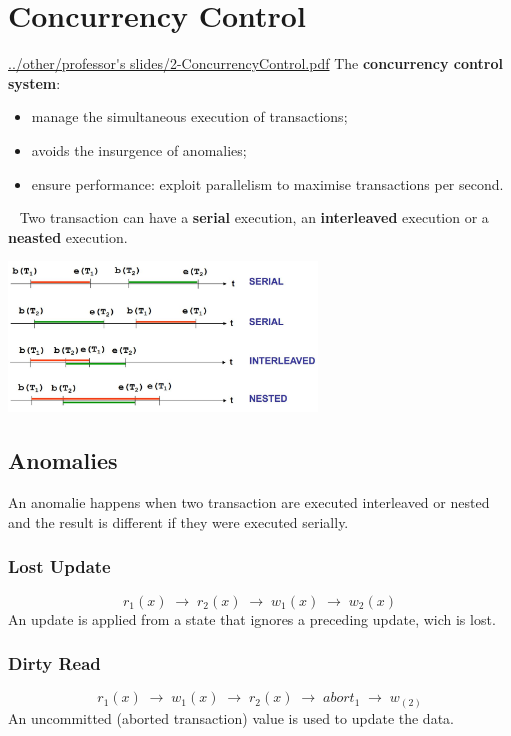 \section{Concurrency Control}
\url{../other/professor's slides/2-ConcurrencyControl.pdf}\newline
\newline
The \textbf{concurrency control system}:
\begin{itemize}
    \item manage the simultaneous execution of transactions;
    \item avoids the insurgence of anomalies;
    \item ensure performance: exploit parallelism to maximise transactions per
    second.
\end{itemize}
\ \newline
Two transaction can have a \textbf{serial} execution, an \textbf{interleaved} execution or a \textbf{neasted} execution.
\begin{center}
    \includegraphics[height=4cm]{../arguments/serial-interleaved-nested.JPG}
\end{center}
\subsection{Anomalies}
An anomalie happens when two transaction are executed interleaved or nested and the result is different if they were executed serially.
\subsubsection{Lost Update}
\[
    r_1(x) \; \rightarrow \; r_2(x) \; \rightarrow \; w_1(x) \; \rightarrow \; w_2(x)
\]
An update is applied from a state that ignores a preceding update, wich is lost.
\subsubsection{Dirty Read}
\[
    r_1(x) \; \rightarrow \; w_1(x) \; \rightarrow \; r_2(x) \; \rightarrow \; abort_1 \; \rightarrow \; w_(2)
\]
An uncommitted (aborted transaction) value is used to update the data.
